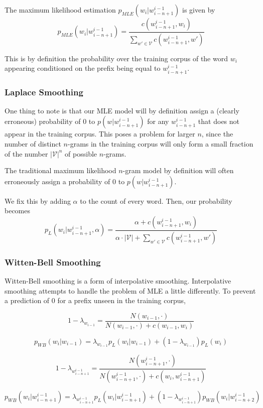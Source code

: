 \documentclass[11pt]{article}
\begin{document}
The maximum likelihood estimation $p_{MLE}(w_i|w^{i-1}_{i-n+1})$ is given by 
$$p_{MLE}(w_i|w^{i-1}_{i-n+1}) = \frac{c(w^{i-1}_{i-n+1}, w_i)}{\sum_{w' \in \mathcal{V}} c(w^{i-1}_{i-n+1}, w')}$$

This is by definition the probability over the training corpus of the word $w_i$ appearing conditioned on the prefix being equal to $w^{i-1}_{i-n+1}$. 

\subsubsection{Laplace Smoothing}

 One thing to note is that our MLE model will by definition assign a (clearly erroneous) probability of $0$ to $p(w|w^{i-1}_{i-n+1})$ for any $w^{i-1}_{i-n+1}$ that does not appear in the training corpus. This poses a problem for larger $n$, since the number of distinct $n$-grams in the training corpus will only form a small fraction of the number $|\mathcal{V}|^n$ of possible $n$-grams.

The traditional maximum likelihood $n$-gram model by definition will often erroneously assign a probability of $0$ to $p(w|w^{i-1}_{i-n+1})$. 

We fix this by adding $\alpha$ to the count of every word. Then, our probability becomes 
$$p_L(w_i|w^{i-1}_{i-n+1}, \alpha) = \frac{\alpha + c(w^{i-1}_{i-n+1}, w_i)}{\alpha \cdot |\mathcal{V}| + \sum_{w' \in \mathcal{V}} c(w^{i-1}_{i-n+1}, w')}$$

\subsubsection{Witten-Bell Smoothing}

Witten-Bell smoothing is a form of interpolative smoothing. Interpolative smoothing attempts to handle the problem of MLE a little differently. To prevent a prediction of $0$ for a prefix unseen in the training corpus, 

$$1 - \lambda_{w_{i-1}} = \frac{N(w_{i-1}, \cdot)}{N(w_{i-1}, \cdot) + c(w_{i-1}, w_i)}$$

$$p_{WB}(w_i|w_{i-1}) = \lambda_{w_{i-1}} p_L(w_i|w_{i-1}) + (1-\lambda_{w_{i-1}}) p_L(w_i)$$

$$1 - \lambda_{w^{i-1}_{i-n+1}} = \frac{N(w^{i-1}_{i-n+1}, \cdot)}{N(w^{i-1}_{i-n+1}, \cdot) + c(w_i, w^{i-1}_{i-n+1})}$$ 

$$p_{WB}(w_i|w^{i-1}_{i-n+1}) = \lambda_{w^{i-1}_{i-n+1}} p_L(w_i|w^{i-1}_{i-n+1}) + (1-\lambda_{w^{i-1}_{i-n+1}}) p_{WB}(w_i|w^{i-1}_{i-n+2})$$
\end{document}
